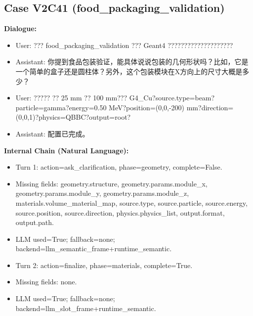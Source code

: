 \documentclass[11pt]{ctexart}
\begin{document}
\subsection{Case V2C41 (food\_packaging\_validation)}
\textbf{Dialogue:}
\begin{itemize}
\item User: ??? food\_packaging\_validation ??? Geant4 ????????????????????
\item Assistant: 你提到食品包装验证，能具体说说包装的几何形状吗？比如，它是一个简单的盒子还是圆柱体？另外，这个包装模块在X方向上的尺寸大概是多少？
\item User: ????? ?? 25 mm ?? 100 mm??? G4\_Cu?source.type=beam?particle=gamma?energy=0.50 MeV?position=(0,0,-200) mm?direction=(0,0,1)?physics=QBBC?output=root?
\item Assistant: 配置已完成。
\end{itemize}
\textbf{Internal Chain (Natural Language):}
\begin{itemize}
\item Turn 1: action=ask\_clarification, phase=geometry, complete=False.
\item Missing fields: geometry.structure, geometry.params.module\_x, geometry.params.module\_y, geometry.params.module\_z, materials.volume\_material\_map, source.type, source.particle, source.energy, source.position, source.direction, physics.physics\_list, output.format, output.path.
\item LLM used=True; fallback=none; backend=llm\_semantic\_frame+runtime\_semantic.
\item Turn 2: action=finalize, phase=materials, complete=True.
\item Missing fields: none.
\item LLM used=True; fallback=none; backend=llm\_slot\_frame+runtime\_semantic.
\end{itemize}
\end{document}
